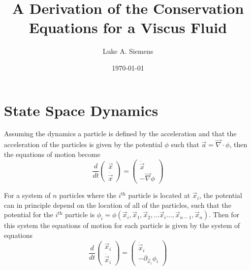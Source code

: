 \documentclass[%
 twocolumn,
 amsmath,amssymb,
 aps,
]{revtex4-1}
\newcommand{\dvec}[1]{\dot{\vec{#1}}}
\newcommand{\grad}{\vec{\nabla}}
\begin{document}
\title{A Derivation of the Conservation Equations for a Viscus Fluid}%

\author{Luke A. Siemens}

\date{\today}

\maketitle

\section{State Space Dynamics}

Assuming the dynamics a particle is defined by the acceleration and that the acceleration of the particles is given by the potential $\phi$ such that $\vec{a} = \vec{\nabla}\cdot\phi$, then the equations of motion become
\[
\frac{d}{dt}\begin{pmatrix} \vec{x} \\ \dvec{x} \end{pmatrix}=\begin{pmatrix} \dvec{x} \\ -\grad\phi \end{pmatrix}
\]

For a system of $n$ particles where the $i^{\text{th}}$ particle is located at $\vec{x}_i$, the potential can in principle depend on the location of all of the particles, such that the potential for the $i^{\text{th}}$ particle is $\phi_i = \phi({\vec{x}_i, \vec{x}_1, \vec{x}_2, ... \vec{x}_i ... , \vec{x}_{n-1}, \vec{x}_n})$. Then for this system the equations of motion for each particle is given by the system of equations
\begin{equation}
\frac{d}{dt}\begin{pmatrix} \vec{x}_i \\ \dvec{x}_i \end{pmatrix}=\begin{pmatrix} \dvec{x}_i \\ -\partial_{\vec{x}_i}\phi_i \end{pmatrix}
\label{discrete_system_dynamics}
\end{equation}
\end{document}
